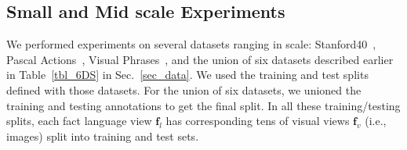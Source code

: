 \documentclass[runningheads]{llncs}
\begin{document}
\begin{comment}
\end{comment}\vspace{-2mm}\subsection{Small and Mid scale Experiments}\vspace{-2mm}%
We  performed experiments on several  datasets ranging in scale: Stanford40~\cite{yao2011human}, Pascal Actions~\cite{yao2010grouplet}, Visual Phrases~\cite{sadeghi2011recognition}, and the union of six datasets described earlier in Table~\ref{tbl_6DS} in Sec.~\ref{sec_data}. We used the training and test splits defined with those datasets. For the union of six datasets, we unioned the training and testing annotations to get the final split.  In all these training/testing splits, each fact language view $\mathbf{f}_l$ has corresponding tens of visual views $\mathbf{f}_v$ (i.e., images) 
split into training and test sets.
\end{document}
